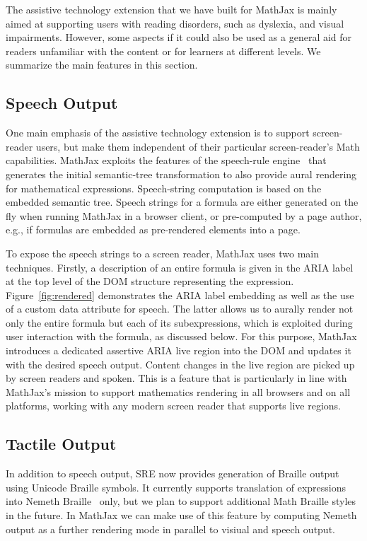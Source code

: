 \documentclass{sig-alternate}
\begin{document}
The assistive technology extension that we have built for MathJax is mainly
aimed at supporting users with reading disorders, such as dyslexia, and visual
impairments. However, some aspects if it could also be used as a general aid for
readers unfamiliar with the content or for learners at different levels. We
summarize the main features in this section.

\subsection{Speech Output}

One main emphasis of the assistive technology extension is to support
screen-reader users, but make them independent of their particular
screen-reader's Math capabilities. MathJax exploits the features of the
speech-rule engine~\cite{Sorge14,SRE-release-3} that generates the initial semantic-tree
transformation to also provide aural rendering for mathematical
expressions. Speech-string computation is based on the embedded semantic
tree. Speech strings for a formula are either generated on the fly when running
MathJax in a browser client, or pre-computed by a page author, e.g.,
if formulas are embedded as pre-rendered elements into a page.

To expose the speech strings to a screen reader, MathJax uses two main
techniques.  Firstly, a description of an entire formula is given in the ARIA
label at the top level of the DOM structure representing the expression.
Figure~\ref{fig:rendered} demonstrates the ARIA label embedding as well as the
use of a custom data attribute for speech. The latter allows us to aurally
render not only the entire formula but each of its subexpressions, which is
exploited during user interaction with the formula, as discussed below.  For
this purpose, MathJax introduces a dedicated assertive ARIA live region into the
DOM and updates it with the desired speech output. Content changes in the live region
are picked up by screen readers and spoken. This is a feature that is
particularly in line with MathJax's mission to support mathematics
rendering in all browsers and on all platforms, working with any modern screen
reader that supports live regions.


\subsection{Tactile Output}

In addition to speech output, SRE now provides generation of Braille
output using Unicode Braille symbols. It currently supports translation of
expressions into Nemeth Braille~\cite{nemeth} only, but we plan to support
additional Math Braille styles in the future. In MathJax we can make use of this
feature by computing Nemeth output as a further rendering mode in parallel to
visiual and speech output.
\end{document}
